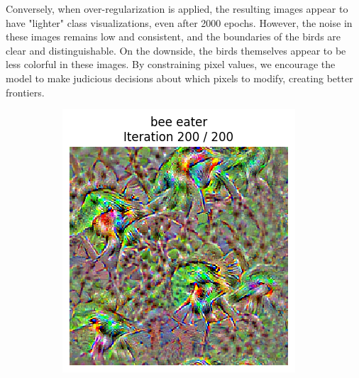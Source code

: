 Conversely, when over-regularization is applied, the resulting images appear to have "lighter" class visualizations, even after 2000 epochs. However, the noise in these images remains low and consistent, and the boundaries of the birds are clear and distinguishable. On the downside, the birds themselves appear to be less colorful in these images. By constraining pixel values, we encourage the model to make judicious decisions about which pixels to modify, creating better frontiers.

\begin{figure}[H]
    \centering
    \begin{subfigure}[t]{.33\textwidth}
        \centering
        \includegraphics[width=\linewidth]{figs_propre2/SqueezeNet/SqueezeNet_bird_animated_reg_5_last_frame.png}
        \caption{}
        \label{fig:class_viz_reg:sub1}
    \end{subfigure}%
    \begin{subfigure}[t]{.33\textwidth}
        \centering

\end{subfigure}
\end{figure}
